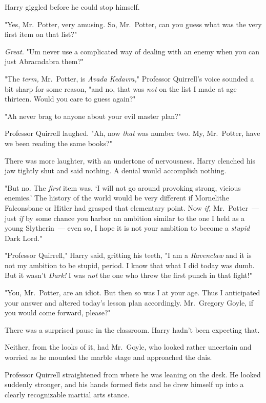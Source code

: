 Harry giggled before he could stop himself.

"Yes, Mr.~Potter, very amusing. So, Mr.~Potter, can you guess what was the very
first item on that list?"

\emph{Great.} "Um{\el} never use a complicated way of dealing with an enemy
when you can just Abracadabra them?"

"The \emph{term,} Mr.~Potter, is \emph{Avada Kedavra,}" Professor Quirrell's
voice sounded a bit sharp for some reason, "and no, that was \emph{not} on the
list I made at age thirteen. Would you care to guess again?"

"Ah{\el} never brag to anyone about your evil master plan?"

Professor Quirrell laughed. "Ah, now \emph{that} was number two. My,
Mr.~Potter, have we been reading the same books?"

There was more laughter, with an undertone of nervousness. Harry clenched his
jaw tightly shut and said nothing. A denial would accomplish nothing.

"But no. The \emph{first} item was, `I will not go around provoking strong,
vicious enemies.' The history of the world would be very different if
Mornelithe Falconsbane or Hitler had grasped that elementary point. Now
\emph{if,} Mr.~Potter~--- just \emph{if} by some chance you harbor an ambition
similar to the one I held as a young Slytherin~--- even so, I hope it is not your
ambition to become a \emph{stupid} Dark Lord."

"Professor Quirrell," Harry said, gritting his teeth, "I am a \emph{Ravenclaw}
and it is not my ambition to be stupid, period. I know that what I did today
was dumb. But it wasn't \emph{Dark!} I was \emph{not} the one who threw the
first punch in that fight!"

"You, Mr.~Potter, are an idiot. But then so was I at your age. Thus I
anticipated your answer and altered today's lesson plan accordingly.
Mr.~Gregory Goyle, if you would come forward, please?"

There was a surprised pause in the classroom. Harry hadn't been expecting that.

Neither, from the looks of it, had Mr.~Goyle, who looked rather uncertain and
worried as he mounted the marble stage and approached the dais.

Professor Quirrell straightened from where he was leaning on the desk. He
looked suddenly stronger, and his hands formed fists and he drew himself up
into a clearly recognizable martial arts stance.

